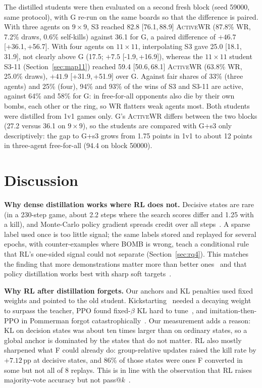 \documentclass[conference]{IEEEtran}
\newcommand{\awr}{\textsc{ActiveWR}}
\newcommand{\pp}{\,pp}
\newcommand{\ci}[2]{[#1,\,#2]}
\begin{document}
The distilled students were then evaluated on a second fresh block (seed 59000, same protocol), with G re-run on the same boards so that the difference is paired. With three agents on $9\times9$, S3 reached 82.8 \ci{76.1}{88.9} \awr{} (87.8\% WR, 7.2\% draws, 0.6\% self-kills) against 36.1 for G, a paired difference of $+46.7$ \ci{+36.1}{+56.7}. With four agents on $11\times11$, interpolating S3 gave 25.0 \ci{18.1}{31.9}, not clearly above G (17.5; $+7.5$ \ci{-1.9}{+16.9}), whereas the $11\times11$ student S3-11 (Section~\ref{sec:map11}) reached 59.4 \ci{50.6}{68.1} \awr{} (63.8\% WR, 25.0\% draws), $+41.9$ \ci{+31.9}{+51.9} over G. Against fair shares of 33\% (three agents) and 25\% (four), 94\% and 93\% of the wins of S3 and S3-11 are active, against 64\% and 58\% for G: in free-for-all opponents also die by their own bombs, each other or the ring, so WR flatters weak agents most. Both students were distilled from 1v1 games only. G's \awr{} differs between the two blocks (27.2 versus 36.1 on $9\times9$), so the students are compared with G+s3 only descriptively: the gap to G+s3 grows from 1.75 points in 1v1 to about 12 points in three-agent free-for-all (94.4 on block 50000).

\section{Discussion}

\textbf{Why dense distillation works where RL does not.} Decisive states are rare (in a 230-step game, about 2.2 steps where the search scores differ and 1.25 with a kill), and Monte-Carlo policy gradient spreads credit over all steps~\cite{williams1992reinforce}. A sparse label used once is too little signal; the same labels stored and replayed for several epochs, with counter-examples where BOMB is wrong, teach a conditional rule that RL's one-sided signal could not separate (Section~\ref{sec:rq4}). This matches the finding that more demonstrations matter more than better ones~\cite{kartal2019safer} and that policy distillation works best with sharp soft targets~\cite{rusu2016distill}.

\textbf{Why RL after distillation forgets.} Our anchors and KL penalties used fixed weights and pointed to the old student. Kickstarting~\cite{schmitt2018kickstart} needed a decaying weight to surpass the teacher, PPO found fixed-$\beta$ KL hard to tune~\cite{schulman2017ppo}, and imitation-then-PPO in Pommerman forgot catastrophically~\cite{meisheri2019}. Our measurement adds a reason: KL on decision states was about ten times larger than on ordinary states, so a global anchor is dominated by the states that do not matter. RL also mostly sharpened what F could already do: group-relative updates raised the kill rate by $+7.12$\pp{} at decisive states, and 86\% of those states were ones F converted in some but not all of 8 replays. This is in line with the observation that RL raises majority-vote accuracy but not pass@$k$~\cite{shao2024grpo}.
\end{document}
